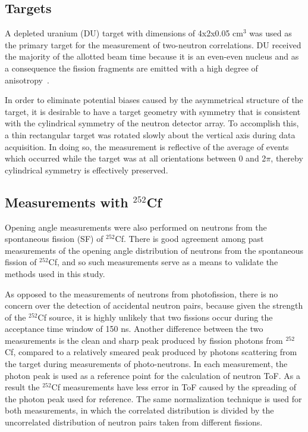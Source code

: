 \subsection{Targets}
A depleted uranium (DU) target with dimensions of 4x2x0.05 $\text{cm}^3$ was used as the primary target for the measurement of two-neutron correlations.
DU received the majority of the allotted beam time because it is an even-even nucleus and as a consequence the fission fragments are emitted with a high degree of anisotropy~\cite{1977FragAss}.

In order to eliminate potential biases caused by the asymmetrical structure of the target, it is desirable to have a target geometry with symmetry that is consistent with the cylindrical symmetry of the neutron detector array.
To accomplish this, a thin rectangular target was rotated slowly about the vertical axis during data acquisition.
In doing so, the measurement is reflective of the average of events which occurred while the target was at all orientations between 0 and 2$\pi$, thereby cylindrical symmetry is effectively preserved.

\subsection{Measurements with $^{252}$Cf}

Opening angle measurements were also performed on neutrons from the spontaneous fission (SF) of $^{252}$Cf.
There is good agreement among past measurements of the opening angle distribution of neutrons from the spontaneous fission of $^{252}$Cf, and so such measurements serve as a means to validate the methods used in this study.

As opposed to the measurements of neutrons from photofission, there is no concern over the detection of accidental neutron pairs, because given the strength of the $^{252}$Cf source, it is highly unlikely that two fissions occur during the acceptance time window of 150 ns.
Another difference between the two measurements is the clean and sharp peak produced by fission photons from $^{252}$Cf, compared to a relatively smeared peak produced by photons scattering from the target during measurements of photo-neutrons.
In each measurement, the photon peak is used as a reference point for the calculation of neutron ToF.
As a result the $^{252}$Cf measurements have less error in ToF caused by the spreading of the photon peak used for reference.
The same normalization technique is used for both measurements, in which the correlated distribution is divided by the uncorrelated distribution of neutron pairs taken from different fissions.

